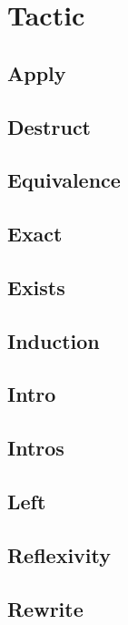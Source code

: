 \section{Tactic}

\subsection{Apply}

\subsection{Destruct}

\subsection{Equivalence}

\subsection{Exact}

\subsection{Exists}

\subsection{Induction}

\subsection{Intro}

\subsection{Intros}

\subsection{Left}

\subsection{Reflexivity}

\subsection{Rewrite}

